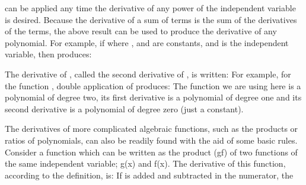 {{%
%
 can be applied any time the derivative of any power of the
independent variable is desired.
Because the derivative of a sum of terms is the sum of the derivatives of
the terms, the above result can be used to produce the derivative of any
polynomial.
%
%
For example, if
%
%
where ,  and  are constants, and  is the independent
variable, then  produces:
%
}%
%
\par{The derivative of , called the second derivative of , is
written:
%
%
For example, for the function , double
application of  produces:
%
%
%
The function  we are using here is a polynomial of degree two, its first derivative is a
polynomial of degree one and its second derivative is a polynomial of degree
zero (just a constant).}%
%
\par{The derivatives of more complicated algebraic functions, such as the
products or ratios of polynomials, can also be readily found with the aid of
some basic rules.
Consider a function which can be written as the product (gf) of two
functions of the same independent variable; g(x) and f(x).
The derivative of this function, according to the definition, is:
%
%
If  is added and subtracted in the numerator, the
}}

